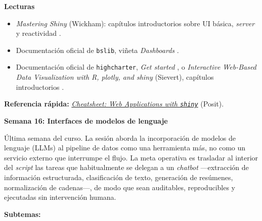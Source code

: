 \documentclass[11pt,letterpaper]{article}
\newcommand{\semana}[2]{%
  \bigskip%
  {\color{main}\Large\bfseries Semana #1: #2\par}%
  \smallskip%
}
\newcommand{\cheatsheet}[2]{%
  \href{https://rstudio.github.io/cheatsheets/#1.pdf}{\textit{Cheatsheet: #2}}%
}
\begin{document}
\medskip
\noindent\textbf{Lecturas}
\begin{itemize}[leftmargin=*, itemsep=1pt]
    \item \textit{Mastering Shiny} (Wickham): capítulos introductorios sobre UI básica, \textit{server} y reactividad \cite{wickham2021mastering-shiny}.
    \item Documentación oficial de \texttt{bslib}, viñeta \textit{Dashboards} \cite{bslib-docs}.
    \item Documentación oficial de \texttt{highcharter}, \textit{Get started} \cite{kunst-highcharter}, o \textit{Interactive Web-Based Data Visualization with R, plotly, and shiny} (Sievert), capítulos introductorios \cite{sievert-plotly}.
\end{itemize}

\medskip
\noindent\textbf{Referencia rápida:} \cheatsheet{shiny}{Web Applications with \texttt{shiny}} (Posit).

\semana{16}{Interfaces de modelos de lenguaje}

Última semana del curso. La sesión aborda la incorporación de modelos de lenguaje (LLMs) al pipeline de datos como una herramienta más, no como un servicio externo que interrumpe el flujo. La meta operativa es trasladar al interior del \textit{script} las tareas que habitualmente se delegan a un \textit{chatbot} ---extracción de información estructurada, clasificación de texto, generación de resúmenes, normalización de cadenas---, de modo que sean auditables, reproducibles y ejecutadas sin intervención humana.

\textbf{Subtemas:}
\end{document}
